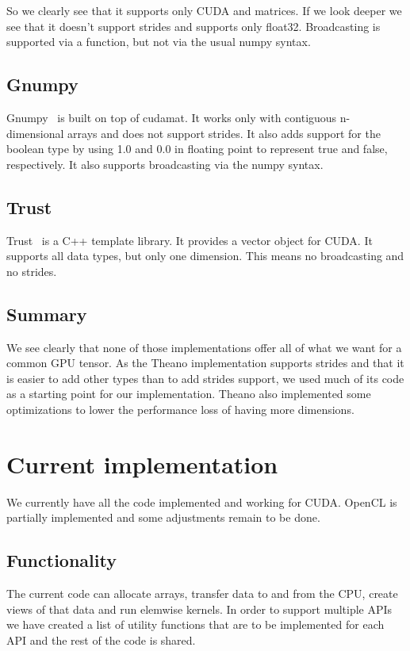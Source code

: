 \documentclass{article} %
\begin{document}
So we clearly see that it supports only CUDA and matrices. 
If we look deeper we see that it doesn't support strides and supports only float32. 
Broadcasting is supported via a function, but not via the usual numpy syntax.

\subsection{Gnumpy}
Gnumpy~\citep{gnumpy-TR2010} is built on top of cudamat.
It works only with contiguous n-dimensional arrays and does not support strides.
It also adds support for the boolean type by using 1.0 and 0.0 in floating point to represent true and false, respectively. 
It also supports broadcasting via the numpy syntax.

\subsection{Trust}
Trust~\citep{Thrust} is a C++ template library.
It provides a vector object for CUDA.
It supports all data types, but only one dimension.
This means no broadcasting and no strides.

\subsection{Summary}
We see clearly that none of those implementations offer all of what we want for a common GPU tensor.
As the Theano implementation supports strides and that it is easier to add other types than to add strides support, we used much of its code as a starting point for our implementation.
Theano also implemented some optimizations to lower the performance loss of having more dimensions.

\section{Current implementation}

We currently have all the code implemented and working for CUDA.
OpenCL is partially implemented and some adjustments remain to be done.

\subsection{Functionality}

The current code can allocate arrays, transfer data to and from the CPU, create views of that data and run elemwise kernels.
In order to support multiple APIs we have created a list of utility functions that are to be implemented for each API and the rest of the code is shared.
\end{document}
